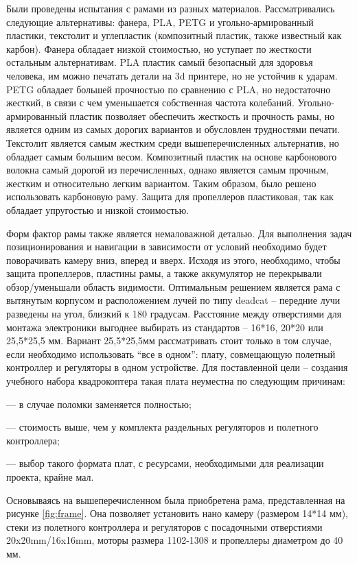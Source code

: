 Были проведены испытания с рамами из разных материалов. Рассматривались следующие альтернативы: фанера, PLA, PETG и угольно-армированный пластики, текстолит и углепластик (композитный пластик, также известный как карбон). Фанера обладает низкой стоимостью, но уступает по жесткости остальным альтернативам. PLA пластик самый безопасный для здоровья человека, им можно печатать детали на 3d принтере, но не устойчив к ударам. PETG обладает большей прочностью по сравнению с PLA, но недостаточно жесткий, в связи с чем уменьшается собственная частота колебаний. Угольно-армированный пластик позволяет обеспечить жесткость и прочность рамы, но является одним из самых дорогих вариантов и обусловлен трудностями печати.
Текстолит является самым жестким среди вышеперечисленных альтернатив, но обладает самым большим весом. Композитный пластик на основе карбонового волокна самый дорогой из перечисленных, однако является самым прочным, жестким и относительно легким вариантом. Таким образом, было решено использовать карбоновую раму.
Защита для пропеллеров пластиковая, так как обладает упругостью и низкой стоимостью.

Форм фактор рамы также является немаловажной деталью. Для выполнения задач позиционирования и навигации в зависимости от условий необходимо будет поворачивать камеру вниз, вперед и вверх. Исходя из этого, необходимо, чтобы защита пропеллеров, пластины рамы, а также аккумулятор не перекрывали обзор/уменьшали область видимости. Оптимальным решением является рама с вытянутым корпусом и расположением лучей по типу deadcat -- передние лучи разведены на угол, близкий к 180 градусам. Расстояние между отверстиями для монтажа электроники выгоднее выбирать из стандартов -- 16*16, 20*20 или 25,5*25,5 мм. Вариант 25,5*25,5мм рассматривать стоит только в том случае, если необходимо использовать “все в одном”: плату, совмещающую полетный контроллер и регуляторы в одном устройстве. Для поставленной цели -- создания учебного набора квадрокоптера такая плата неуместна по следующим причинам:

--- в случае поломки заменяется полностью;

--- стоимость выше, чем у комплекта раздельных регуляторов и полетного контроллера;

--- выбор такого формата плат, с ресурсами, необходимыми для реализации проекта, крайне мал.

Основываясь на вышеперечисленном была приобретена рама, представленная на рисунке \ref{fig:frame}. Она позволяет установить нано камеру (размером 14*14 мм), стеки из полетного контроллера и регуляторов с посадочными отверстиями 20x20mm/16x16mm, моторы размера 1102-1308 и пропеллеры диаметром до 40 мм.

